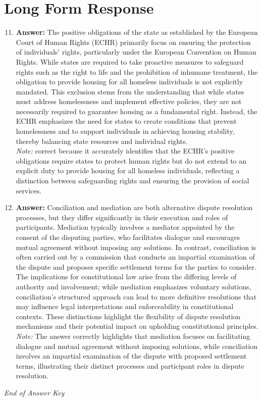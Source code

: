 \documentclass[12pt]{article}
\begin{document}
\section*{Long Form Response}
\begin{enumerate}[label=\arabic*.]
\setcounter{enumi}{10}
\item \textbf{Answer:} The positive obligations of the state as established by the European Court of Human Rights (ECHR) primarily focus on ensuring the protection of individuals' rights, particularly under the European Convention on Human Rights. While states are required to take proactive measures to safeguard rights such as the right to life and the prohibition of inhumane treatment, the obligation to provide housing for all homeless individuals is not explicitly mandated. This exclusion stems from the understanding that while states must address homelessness and implement effective policies, they are not necessarily required to guarantee housing as a fundamental right. Instead, the ECHR emphasizes the need for states to create conditions that prevent homelessness and to support individuals in achieving housing stability, thereby balancing state resources and individual rights.
\\ \textit{Note:} correct because it accurately identifies that the ECHR's positive obligations require states to protect human rights but do not extend to an explicit duty to provide housing for all homeless individuals, reflecting a distinction between safeguarding rights and ensuring the provision of social services.
\item \textbf{Answer:} Conciliation and mediation are both alternative dispute resolution processes, but they differ significantly in their execution and roles of participants. Mediation typically involves a mediator appointed by the consent of the disputing parties, who facilitates dialogue and encourages mutual agreement without imposing any solutions. In contrast, conciliation is often carried out by a commission that conducts an impartial examination of the dispute and proposes specific settlement terms for the parties to consider. The implications for constitutional law arise from the differing levels of authority and involvement; while mediation emphasizes voluntary solutions, conciliation's structured approach can lead to more definitive resolutions that may influence legal interpretations and enforceability in constitutional contexts. These distinctions highlight the flexibility of dispute resolution mechanisms and their potential impact on upholding constitutional principles.
\\ \textit{Note:} The answer correctly highlights that mediation focuses on facilitating dialogue and mutual agreement without imposing solutions, while conciliation involves an impartial examination of the dispute with proposed settlement terms, illustrating their distinct processes and participant roles in dispute resolution.
\end{enumerate}

\vfill
\noindent\textit{End of Answer Key}
\end{document}
